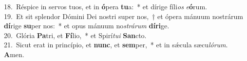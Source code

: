 {18.~}Réspice in servos tuos, et in \textbf{ó}pera \textbf{tu}a:~* et dírige fíli\textit{os} \textit{e}\textbf{ó}rum.\\
{19.~}Et sit splendor Dómini Dei nostri super nos,~† et ópera mánuum nostrárum \textbf{dí}rige \textbf{su}per nos:~* et opus mánuum no\textit{strá}\textit{rum} \textbf{dí}\textbf{ri}ge.\\
{20.~}Glória \textbf{Pa}tri, et \textbf{Fí}lio,~* et Spirí\textit{tu}\textit{i} \textbf{San}cto.\\
{21.~}Sicut erat in princípio, et \textbf{nunc}, et \textbf{sem}per,~* et in sǽcula sæcu\textit{ló}\textit{rum}. \textbf{A}men.\\
